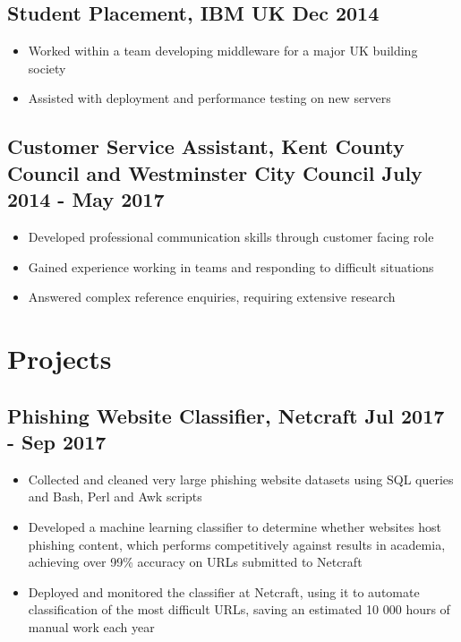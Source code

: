 \documentclass[a4paper]{article}
\begin{document}
\begin{minipage}[t]{.66\textwidth}
\subsection*{Student Placement, IBM UK \hfill Dec 2014}
\begin{itemize}
	\item Worked within a team developing middleware for a major UK building society
	\item Assisted with deployment and performance testing on new servers
\end{itemize}

\subsection*{Customer Service Assistant, Kent County Council and Westminster City Council \hfill July 2014 - May 2017}
\begin{itemize}
	\item Developed professional communication skills through customer facing role
	\item Gained experience working in teams and responding to difficult situations
	\item Answered complex reference enquiries, requiring extensive research
\end{itemize}


\section*{Projects}

\subsection*{Phishing Website Classifier, Netcraft \hfill Jul 2017 - Sep 2017}
\begin{itemize}
\item Collected and cleaned very large phishing website datasets using SQL queries and Bash, Perl and Awk scripts
\item Developed a machine learning classifier to determine whether websites host phishing content, which performs competitively against results in academia, achieving over 99\% accuracy on URLs submitted to Netcraft
\item Deployed and monitored the classifier at Netcraft, using it to automate classification of the most difficult URLs, saving an estimated 10 000 hours of manual work each year
\end{itemize}


\end{minipage}
\end{document}
